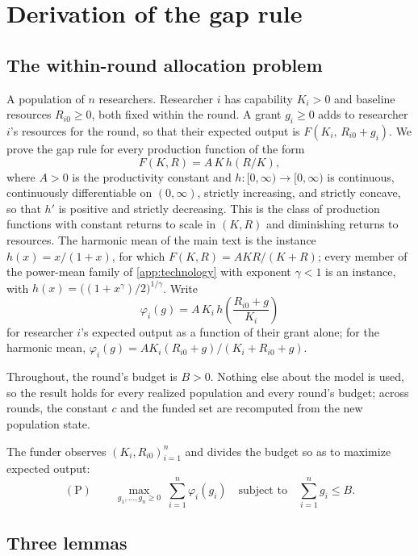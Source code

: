 \section{Derivation of the gap rule}\label{app:gap-rule}

\subsection*{The within-round allocation problem}

A population of $n$ researchers. Researcher $i$ has capability $K_i > 0$ and baseline resources $R_{i0} \geq 0$, both fixed within the round. A grant $g_i \geq 0$ adds to researcher $i$'s resources for the round, so that their expected output is $F(K_i,\, R_{i0} + g_i)$. We prove the gap rule for every production function of the form
\[
F(K, R) = A\,K\,h(R/K),
\]
where $A > 0$ is the productivity constant and $h\colon [0, \infty) \to [0, \infty)$ is continuous, continuously differentiable on $(0, \infty)$, strictly increasing, and strictly concave, so that $h'$ is positive and strictly decreasing. This is the class of production functions with constant returns to scale in $(K, R)$ and diminishing returns to resources. The harmonic mean of the main text is the instance $h(x) = x/(1 + x)$, for which $F(K, R) = AKR/(K + R)$; every member of the power-mean family of \ref{app:technology} with exponent $\gamma < 1$ is an instance, with $h(x) = \big((1 + x^{\gamma})/2\big)^{1/\gamma}$. Write
\[
\varphi_i(g) = A\,K_i\,h\!\left(\frac{R_{i0} + g}{K_i}\right)
\]
for researcher $i$'s expected output as a function of their grant alone; for the harmonic mean, $\varphi_i(g) = A K_i (R_{i0} + g)/(K_i + R_{i0} + g)$.

Throughout, the round's budget is $B > 0$. Nothing else about the model is used, so the result holds for every realized population and every round's budget; across rounds, the constant $c$ and the funded set are recomputed from the new population state.

The funder observes $(K_i, R_{i0})_{i=1}^n$ and divides the budget so as to maximize expected output:
\[
(\mathrm{P}) \qquad \max_{g_1, \ldots, g_n \geq 0} \; \sum_{i=1}^n \varphi_i(g_i) \quad \text{subject to} \quad \sum_{i=1}^n g_i \leq B.
\]

\subsection*{Three lemmas}

